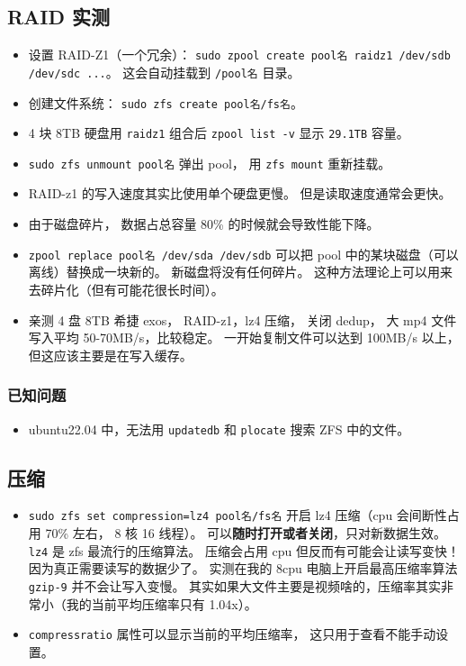 \subsection{RAID 实测}
\begin{itemize}
\item 设置 RAID-Z1（一个冗余）： \verb|sudo zpool create pool名 raidz1 /dev/sdb /dev/sdc ...|。 这会自动挂载到 \verb|/pool名| 目录。
\item 创建文件系统： \verb|sudo zfs create pool名/fs名|。
\item 4 块 8TB 硬盘用 \verb|raidz1| 组合后 \verb|zpool list -v| 显示 \verb|29.1TB| 容量。
\item \verb|sudo zfs unmount pool名| 弹出 pool， 用 \verb|zfs mount| 重新挂载。
\item RAID-z1 的写入速度其实比使用单个硬盘更慢。 但是读取速度通常会更快。
\item 由于磁盘碎片， 数据占总容量 80\% 的时候就会导致性能下降。
\item \verb|zpool replace pool名 /dev/sda /dev/sdb| 可以把 pool 中的某块磁盘（可以离线）替换成一块新的。 新磁盘将没有任何碎片。 这种方法理论上可以用来去碎片化（但有可能花很长时间）。
\item 亲测 4 盘 8TB 希捷 exos， RAID-z1，lz4 压缩， 关闭 dedup， 大 mp4 文件写入平均 50-70MB/s，比较稳定。 一开始复制文件可以达到 100MB/s 以上，但这应该主要是在写入缓存。
\end{itemize}

\subsubsection{已知问题}
\begin{itemize}
\item ubuntu22.04 中，无法用 \verb`updatedb` 和 \verb`plocate` 搜索 ZFS 中的文件。
\end{itemize}

\subsection{压缩}
\begin{itemize}
\item \verb|sudo zfs set compression=lz4 pool名/fs名| 开启 lz4 压缩（cpu 会间断性占用 70\% 左右， 8 核 16 线程）。 可以\textbf{随时打开或者关闭}，只对新数据生效。 \verb|lz4| 是 zfs 最流行的压缩算法。 压缩会占用 cpu 但反而有可能会让读写变快！ 因为真正需要读写的数据少了。 实测在我的 8cpu 电脑上开启最高压缩率算法 \verb|gzip-9| 并不会让写入变慢。 其实如果大文件主要是视频啥的，压缩率其实非常小（我的当前平均压缩率只有 1.04x）。
\item \verb|compressratio| 属性可以显示当前的平均压缩率， 这只用于查看不能手动设置。
\end{itemize}

